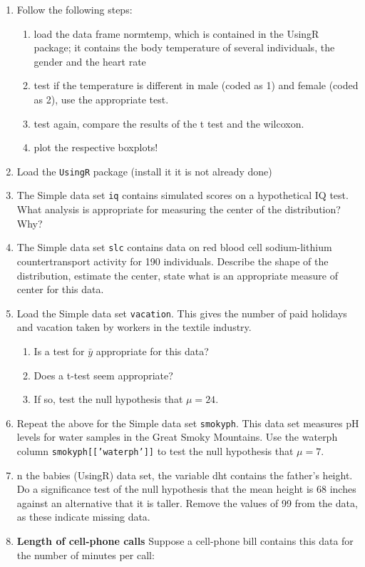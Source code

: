 \documentclass[11pt]{article}
\begin{document}
  \begin{enumerate}
  \item Follow the following steps:
    \begin{enumerate}
    \item load the data frame normtemp, which is contained in the UsingR package; it contains the body temperature of several individuals, the gender and the heart rate
    \item test if the temperature is different in male (coded as 1) and female (coded as 2), use the appropriate test.
    \item test again, compare the results of the t test and the wilcoxon.
    \item plot the respective boxplots!
    \end{enumerate}
  \item Load the \texttt{UsingR} package (install it it is not already done)
  \item The Simple data set \texttt{iq} contains simulated scores on a hypothetical IQ test. What analysis is appropriate for measuring the center of the distribution? Why?
  \item The Simple data set \texttt{slc} contains data on red blood cell sodium-lithium countertransport activity for 190 individuals. Describe the shape of the distribution, estimate the center, state what is an appropriate measure of center for this data.
  \item  Load the Simple data set \texttt{vacation}. This gives the number of paid holidays and vacation taken by workers in
    the textile industry.
    \begin{enumerate}
    \item Is a test for $\bar{y}$ appropriate for this data?
    \item Does a t-test seem appropriate?
    \item If so, test the null hypothesis that $\mu = 24$. 
    \end{enumerate}
  \item  Repeat the above for the Simple data set \texttt{smokyph}. This data set measures pH levels for water samples in the Great Smoky Mountains. Use the waterph column \texttt{smokyph[[’waterph’]]} to test the null hypothesis that
    $\mu = 7$.
  \item n the babies (UsingR) data set, the variable dht contains the father’s height. Do a significance test of the null hypothesis that  the mean height is 68 inches against an alternative that it is taller. Remove the values of 99 from the data, as these indicate missing data.
  \item \textbf{Length of cell-phone calls} Suppose a cell-phone bill contains this data for the number of minutes per call: 


\end{enumerate}
\end{document}
